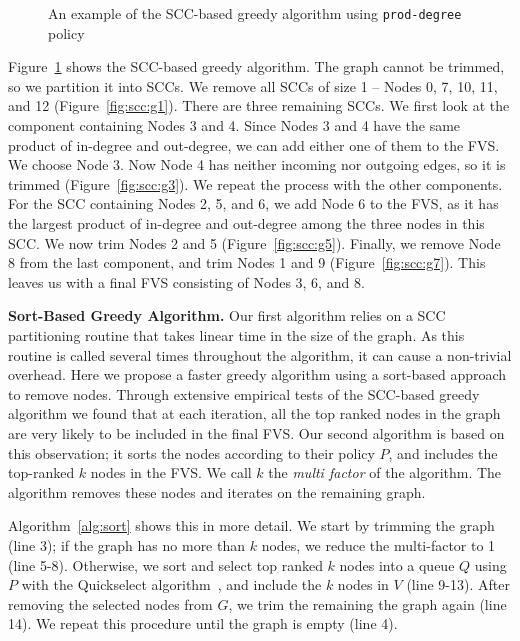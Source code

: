 \begin{figure}[t]
\begin{minipage}[b]{0.19\linewidth}
	\end{minipage}  
	\vspace{-1em}             
	\caption{An example of the SCC-based greedy algorithm using \texttt{prod-degree} policy}
	\vspace{-1em}
	\label{fig:scc}
\end{figure}

Figure~\ref{fig:scc} shows the SCC-based greedy algorithm. The graph cannot be trimmed, so we partition it into SCCs. We remove all SCCs of size 1 --  Nodes 0, 7, 10, 11, and 12 (Figure~\ref{fig:scc:g1}). There are three remaining SCCs. We first look at the component containing Nodes 3 and 4. Since Nodes 3 and 4 have the same product of in-degree and out-degree, we can add either one of them to the FVS. We choose Node 3. Now Node 4 has neither incoming nor outgoing edges, so it is trimmed (Figure~\ref{fig:scc:g3}). We repeat the process with the other components. For the SCC containing Nodes 2, 5, and 6, we add Node 6 to the FVS, as it has the largest product of in-degree and out-degree among the three nodes in this SCC. We now trim Nodes 2 and 5 (Figure~\ref{fig:scc:g5}). Finally, we remove Node 8 from the last component, and trim Nodes 1 and 9 (Figure~\ref{fig:scc:g7}). This leaves us with a final FVS consisting of Nodes 3, 6, and 8.

{\bf Sort-Based Greedy Algorithm.} Our first algorithm relies on a SCC partitioning routine that takes linear time in the size of the graph. As this routine is called several times throughout the algorithm, it can cause a non-trivial overhead. Here we propose a faster greedy algorithm using a sort-based approach to remove nodes. Through extensive empirical tests of the SCC-based greedy algorithm we found that at each iteration, all the top ranked nodes in the graph are very likely to be included in the final FVS. Our second algorithm is based on this observation; it sorts the nodes according to their policy $P$, and includes the top-ranked $k$ nodes in the FVS. We call $k$ the \emph{multi factor} of the algorithm. The algorithm removes these nodes and iterates on the remaining graph.

Algorithm~\ref{alg:sort} shows this in more detail. We start by trimming the graph (line 3); if the graph has no more than $k$ nodes, we reduce the multi-factor to 1 (line 5-8). Otherwise, we sort and select top ranked $k$ nodes into a queue $Q$ using $P$ with the Quickselect algorithm~\cite{hoare61cacm}, and include the $k$ nodes in $V$ (line 9-13).
After removing the selected nodes from $G$, we trim the remaining the graph
again (line 14). We repeat this procedure until the graph is empty (line 4). 

